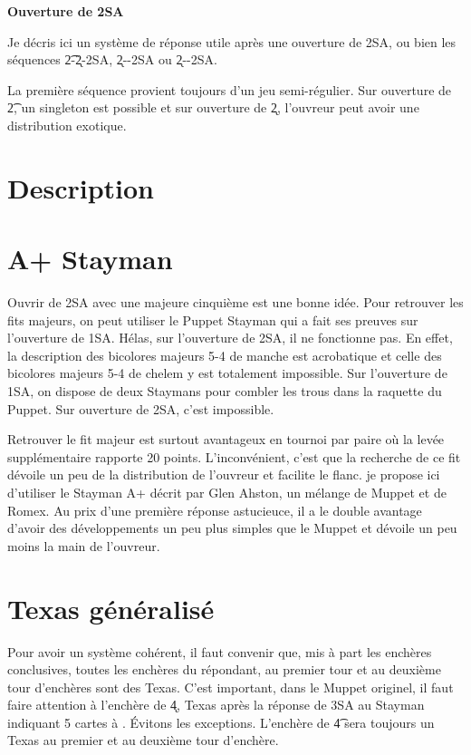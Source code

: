\documentclass[a4paper,12pt]{article}
\begin{document}
\begin{center}
 \LARGE{\bf Ouverture de 2SA}
\end{center}

Je décris ici un système de réponse utile après une ouverture de 2SA, ou bien les séquences \t2-\k2-2SA, \k2--2SA ou \k2--2SA.

La première séquence provient toujours d'un jeu semi-régulier. Sur ouverture de \t2, un singleton est possible et sur ouverture de \k2, l'ouvreur peut avoir une distribution exotique.


\section{Description}

\section*{A+ Stayman}

Ouvrir de 2SA avec une majeure cinquième est une bonne idée. Pour retrouver les fits majeurs, on peut utiliser le Puppet Stayman qui a fait ses preuves sur l'ouverture de 1SA. Hélas, sur l'ouverture de 2SA, il ne fonctionne pas. En effet, la description des bicolores majeurs 5-4 de manche est acrobatique et celle des bicolores majeurs 5-4 de chelem y est totalement impossible.
Sur l'ouverture de 1SA, on dispose de deux Staymans pour combler les trous dans la raquette du Puppet. Sur ouverture de 2SA, c'est impossible.


Retrouver le fit majeur est surtout avantageux en tournoi par paire où la levée supplémentaire rapporte 20 points. L'inconvénient, c'est que la recherche de ce fit dévoile un peu de la distribution de l'ouvreur et facilite le flanc. je propose ici d'utiliser le Stayman A+ décrit par Glen Ahston, un mélange de Muppet et de Romex. Au prix d'une première réponse astucieuce, il a le double avantage d'avoir des développements un peu plus simples que le Muppet et dévoile un peu moins la main de l'ouvreur.

\section*{Texas généralisé}

Pour avoir un système cohérent, il faut convenir que, mis à part les enchères conclusives, toutes les enchères du répondant, au premier tour et au deuxième tour d'enchères sont des Texas. C'est important, dans le Muppet originel, il faut faire attention à l'enchère de \k4, Texas \C après la réponse de 3SA au Stayman indiquant 5 cartes à \C. Évitons les exceptions. L'enchère de \t4 sera toujours un Texas \K au premier et au deuxième tour d'enchère. 
\end{document}
